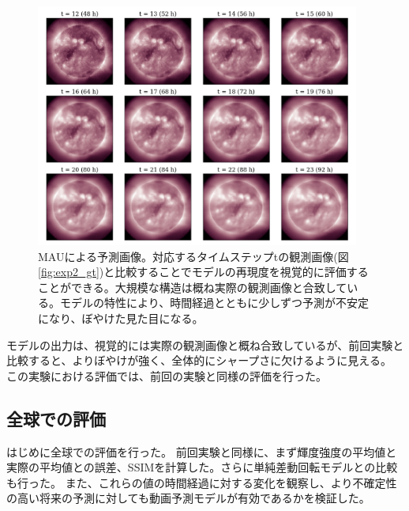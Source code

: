     \begin{figure}[htbp]
      \centering
      \includegraphics[width=0.95\textwidth]{figures/exp2/pd.png}
      \caption{MAUによる予測画像。対応するタイムステップtの観測画像(図\ref{fig:exp2_gt})と比較することでモデルの再現度を視覚的に評価することができる。大規模な構造は概ね実際の観測画像と合致している。モデルの特性により、時間経過とともに少しずつ予測が不安定になり、ぼやけた見た目になる。}
      \label{fig:exp2_pd}
    \end{figure}
    モデルの出力は、視覚的には実際の観測画像と概ね合致しているが、前回実験と比較すると、よりぼやけが強く、全体的にシャープさに欠けるように見える。
    この実験における評価では、前回の実験と同様の評価を行った。
  
    \subsection{全球での評価}
      はじめに全球での評価を行った。
      前回実験と同様に、まず輝度強度の平均値と実際の平均値との誤差、SSIMを計算した。さらに単純差動回転モデルとの比較も行った。
      また、これらの値の時間経過に対する変化を観察し、より不確定性の高い将来の予測に対しても動画予測モデルが有効であるかを検証した。

